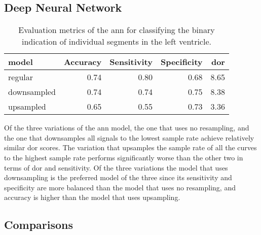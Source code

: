 \newpage

\subsection{Deep Neural Network}

\begin{table*}[htb]
    \centering
    \begin{tabular}{lrrrr}
        \toprule
        model      &  Accuracy &  Sensitivity &  Specificity &  \acrshort{dor} \\
        \midrule
        regular     &      0.74 &         0.80 &         0.68 & 8.65 \\
        downsampled &      0.74 &         0.74 &         0.75 & 8.38 \\
        upsampled   &      0.65 &         0.55 &         0.73 & 3.36 \\
        \bottomrule
    \end{tabular}
    \caption{Evaluation metrics of the \acrshort{ann} for classifying the binary indication of individual segments in the left ventricle.}
    \label{tab:ANN_segm_ind_perf}
\end{table*}

Of the three variations of the \acrshort{ann} model, the one that uses no resampling, and the one that downsamples all signals to the lowest sample rate achieve relatively similar \acrshort{dor} scores. The variation that upsamples the sample rate of all the curves to the highest sample rate performs significantly worse than the other two in terms of \acrshort{dor} and sensitivity. Of the three variations the model that uses downsampling is the preferred model of the three since its sensitivity and specificity are more balanced than the model that uses no resampling, and accuracy is higher than the model that uses upsampling.

\subsection{Comparisons}


